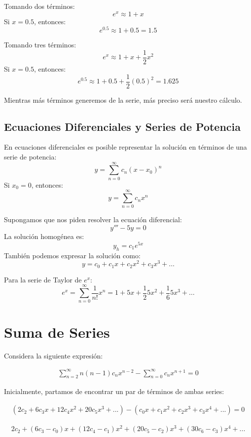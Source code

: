 Tomando dos términos:
\[
e^x \approx 1 + x
\]
Si \( x = 0.5 \), entonces:
\[
e^{0.5} \approx 1 + 0.5 = 1.5
\]

Tomando tres términos:
\[
e^x \approx 1 + x + \frac{1}{2}x^2
\]
Si \( x = 0.5 \), entonces:
\[
e^{0.5} \approx 1 + 0.5 + \frac{1}{2} (0.5)^2 = 1.625
\]

Mientras más términos generemos de la serie, más preciso será nuestro cálculo.

\subsection{Ecuaciones Diferenciales y Series de Potencia}

En ecuaciones diferenciales es posible representar la solución en términos de una serie de potencia:
\[
y = \sum _{n=0}^{\infty } c_{n} (x - x_0)^n
\]
Si \( x_0 = 0 \), entonces:
\[
y = \sum _{n=0}^{\infty } c_{n} x^n
\]

Supongamos que nos piden resolver la ecuación diferencial:
\[
y''' - 5y = 0
\]
La solución homogénea es:
\[
y_h = c_1 e^{5x}
\]
También podemos expresar la solución como:
\[
y = c_0 + c_1 x + c_2 x^2 + c_3 x^3 + \dots
\]

Para la serie de Taylor de \( e^x \):
\[
e^{x} = \sum _{n=0}^{\infty } \frac{1}{n!} x^{n} = 1 + 5x + \frac{1}{2} 5x^2 + \frac{1}{6} 5x^3 + \dots
\]



\section{Suma de Series}

Considera la siguiente expresión:

\begin{gather*}
\sum _{n=2}^{\infty } n( n-1) c_{n} x^{n-2} -\sum _{n=0}^{\infty } c_{n} x^{n+1} = 0
\end{gather*}

Inicialmente, partamos de encontrar un par de términos de ambas series:

\begin{gather*}
\left( 2c_{2} + 6c_{3} x + 12c_{4} x^{2} + 20c_{5} x^{3} +...\right) - \left( c_{0} x + c_{1} x^{2} + c_{2} x^{3} + c_{3} x^{4} +...\right) = 0
\end{gather*}

\begin{gather*}
2c_{2} + (6c_{3} - c_{0}) x + (12c_{4} - c_{1}) x^{2} + (20c_{5} - c_{2}) x^{3} + (30c_{6} - c_{3}) x^{4} +...
\end{gather*}


